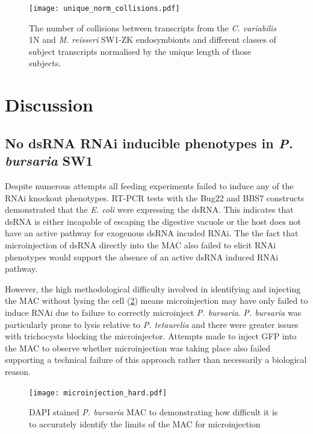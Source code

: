 \begin{figure}
    \centering
    \texttt{[image: unique\_norm\_collisions.pdf]}
    \caption[Normalised Unique eDicer Collisions]{The number of collisions
        between transcripts from the \textit{C. variabilis} 1N
    and \textit{M. reisseri} SW1-ZK endosymbionts and different
classes of subject transcripts normalised by the unique length of those
subjects.}
    \label{fig:edicer_unique_norm}
\end{figure}


\section{Discussion}


\subsection{No dsRNA RNAi inducible phenotypes in \textit{P. bursaria} SW1}

Despite numerous attempts all feeding experiments failed to induce
any of the RNAi knockout phenotypes.  RT-PCR tests with the Bug22
and BBS7 constructs demonstrated
that the \textit{E. coli} were expressing the dsRNA.  
This indicates that dsRNA is either incapable of escaping the digestive vacuole
or the host does not have an active pathway for exogenous dsRNA incuded
RNAi.  The the fact that microinjection of dsRNA directly into the MAC
also failed to elicit RNAi phenotypes would support the absence
of an active dsRNA induced RNAi pathway. 

However, the high methodological difficulty involved in identifying and injecting
the MAC without lysing the cell (\cref{fig:microinjection_nucleus}) 
means microinjection may have only failed to induce RNAi due to failure
to correctly microinject \textit{P. bursaria}.   \textit{P. bursaria}
was particularly prone to lysis relative to \textit{P. tetaurelia} and
there were greater issues with trichocysts blocking the microinjector. 
Attempts made to inject GFP into the MAC to observe whether microinjection
was taking place also failed supporting a technical failure of this
approach rather than necessarily a biological reason.

\begin{figure}
    \texttt{[image: microinjection\_hard.pdf]}
    \caption[DAPI Stained \textit{P. bursaria} MAC]{DAPI stained \textit{P. bursaria}
        MAC to demonstrating how difficult it is to accurately identify the limits
    of the MAC for microinjection}
    \label{fig:microinjection_nucleus}
\end{figure}


